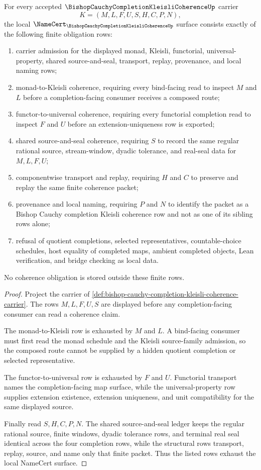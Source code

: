 \begin{theorem}
\label{thm:bishop-cauchy-completion-kleisli-coherence-namecert-obligations}
For every accepted $\BishopCauchyCompletionKleisliCoherenceUp$ carrier
$$
K=(M,L,F,U,S,H,C,P,N),
$$
the local $\NameCert_{\BishopCauchyCompletionKleisliCoherenceUp}$ surface consists exactly of the following finite obligation rows:
\begin{enumerate}
\item carrier admission for the displayed monad, Kleisli, functorial, universal-property, shared source-and-seal, transport, replay, provenance, and local naming rows;
\item monad-to-Kleisli coherence, requiring every bind-facing read to inspect $M$ and $L$ before a completion-facing consumer receives a composed route;
\item functor-to-universal coherence, requiring every functorial completion read to inspect $F$ and $U$ before an extension-uniqueness row is exported;
\item shared source-and-seal coherence, requiring $S$ to record the same regular rational source, stream-window, dyadic tolerance, and real-seal data for $M,L,F,U$;
\item componentwise transport and replay, requiring $H$ and $C$ to preserve and replay the same finite coherence packet;
\item provenance and local naming, requiring $P$ and $N$ to identify the packet as a Bishop Cauchy completion Kleisli coherence row and not as one of its sibling rows alone;
\item refusal of quotient completions, selected representatives, countable-choice schedules, host equality of completed maps, ambient completed objects, Lean verification, and bridge checking as local data.
\end{enumerate}
No coherence obligation is stored outside these finite rows.
\end{theorem}
\begin{proof}
Project the carrier of \autoref{def:bishop-cauchy-completion-kleisli-coherence-carrier}. The rows $M,L,F,U,S$ are displayed before any completion-facing consumer can read a coherence claim.

The monad-to-Kleisli row is exhausted by $M$ and $L$. A bind-facing consumer must first read the monad schedule and the Kleisli source-family admission, so the composed route cannot be supplied by a hidden quotient completion or selected representative.

The functor-to-universal row is exhausted by $F$ and $U$. Functorial transport names the completion-facing map surface, while the universal-property row supplies extension existence, extension uniqueness, and unit compatibility for the same displayed source.

Finally read $S,H,C,P,N$. The shared source-and-seal ledger keeps the regular rational source, finite windows, dyadic tolerance rows, and terminal real seal identical across the four completion rows, while the structural rows transport, replay, source, and name only that finite packet. Thus the listed rows exhaust the local NameCert surface.
\end{proof}

